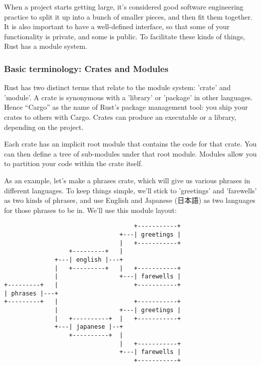When a project starts getting large, it's considered good software engineering practice to split it up into a bunch of smaller 
pieces, and then fit them together. It is also important to have a well-defined interface, so that some of your functionality is 
private, and some is public. To facilitate these kinds of things, Rust has a module system.

\subsubsection*{Basic terminology: Crates and Modules}

Rust has two distinct terms that relate to the module system: 'crate' and 'module'. A crate is synonymous with a 'library' or 
'package' in other languages. Hence “Cargo” as the name of Rust's package management tool: you ship your crates to others with 
Cargo. Crates can produce an executable or a library, depending on the project.

\blank

Each crate has an implicit root module that contains the code for that crate. You can then define a tree of sub-modules under 
that root module. Modules allow you to partition your code within the crate itself.

\blank

As an example, let's make a phrases crate, which will give us various phrases in different languages. To keep things simple, we'll 
stick to 'greetings' and 'farewells' as two kinds of phrases, and use English and Japanese (日本語) as two languages for those phrases 
to be in. We'll use this module layout:

\begin{verbatim}
                                    +-----------+
                                +---| greetings |
                                |   +-----------+
                  +---------+   |
              +---| english |---+
              |   +---------+   |   +-----------+
              |                 +---| farewells |
+---------+   |                     +-----------+
| phrases |---+
+---------+   |                     +-----------+
              |                 +---| greetings |
              |   +----------+  |   +-----------+
              +---| japanese |--+
                  +----------+  |
                                |   +-----------+
                                +---| farewells |
                                    +-----------+
\end{verbatim}

